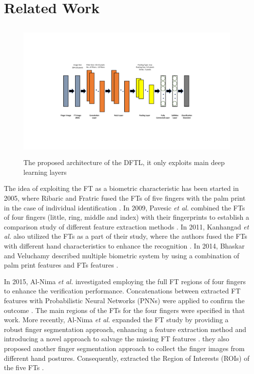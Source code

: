 \documentclass[conference]{IEEEtran}
\begin{document}
\section{Related Work}
\begin{figure}[!t]
    \centering
    \includegraphics[page=1,height=7cm,width=20cm,trim=5cm 4cm 3cm 4cm,clip]{DFTL.pdf}
    \caption{The proposed architecture of the DFTL, it only exploits main deep learning layers}
    \label{fig:DFTL}
\end{figure}
The idea of exploiting the FT as a biometric characteristic has been started in 2005, where Ribaric and Fratric fused the FTs of five fingers with the palm print in the case of individual identification \cite{Ribaric2005ABiometric}. In 2009, Pavesic \textit{et al.} combined the FTs of four fingers (little, ring, middle and index) with their fingerprints to establish a comparison study of different feature extraction methods \cite{Pavesic2009Finger-based}. In 2011, Kanhangad \textit{et al.} also utilized the FTs as a part of their study, where the authors fused the FTs with different hand characteristics to enhance the recognition \cite{Kanhangad2011AUnified}. In 2014, Bhaskar and Veluchamy described multiple biometric system by using a combination of palm print features and FTs features \cite{Bhaskar2014Hand}. 

In 2015, Al-Nima \textit{et al.} investigated employing the full FT regions of four fingers to enhance the verification performance. Concatenations between extracted FT features with Probabilistic Neural Networks (PNNs) were applied to confirm the outcome \cite{Al-Nima2015Human}. The main regions of the FTs for the four fingers were specified in that work. More recently, Al-Nima \textit{et al.} expanded the FT study by providing a robust finger segmentation approach, enhancing a feature extraction method and introducing a novel approach to salvage the missing FT features \cite{Al-Nima2017Robust}. %
 they also proposed another finger segmentation approach to collect the finger images from different hand postures. Consequently, extracted the Region of Interests (ROIs) of the five FTs \cite{Al-Nima2017efficient}.
\end{document}
